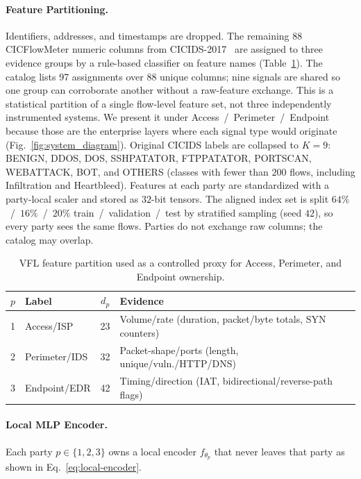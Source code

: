 \documentclass[10pt, conference]{IEEEtran}
\begin{document}
\paragraph{Feature Partitioning.}
Identifiers, addresses, and timestamps are dropped. The remaining 88 CICFlowMeter numeric columns from CICIDS-2017~\cite{sharafaldin2018} are assigned to three evidence groups by a rule-based classifier on feature names (Table~\ref{tab:detect-parties}). The catalog lists 97 assignments over 88 unique columns; nine signals are shared so one group can corroborate another without a raw-feature exchange. This is a statistical partition of a single flow-level feature set, not three independently instrumented systems. We present it under Access~/~Perimeter~/~Endpoint because those are the enterprise layers where each signal type would originate (Fig.~\ref{fig:system_diagram}). Original CICIDS labels are collapsed to $K=9$: BENIGN, DDOS, DOS, SSHPATATOR, FTPPATATOR, PORTSCAN, WEBATTACK, BOT, and OTHERS (classes with fewer than $200$ flows, including Infiltration and Heartbleed). Features at each party are standardized with a party-local scaler and stored as $32$-bit tensors. The aligned index set is split $64\%$~/~$16\%$~/~$20\%$ train~/~validation~/~test by stratified sampling (seed $42$), so every party sees the same flows. Parties do not exchange raw columns; the catalog may overlap.

\begin{table}[t]
\caption{VFL feature partition used as a controlled proxy for Access, Perimeter, and Endpoint ownership.}
\label{tab:detect-parties}
\centering
\small
\begin{tabularx}{\columnwidth}{@{}clc>{\RaggedRight\arraybackslash}X@{}}
\hline
$p$ & Label & $d_p$ & Evidence \\
\hline
1 & Access/ISP     & 23 & Volume/rate (duration, packet/byte totals, SYN counters) \\
2 & Perimeter/IDS  & 32 & Packet-shape/ports (length, unique/vuln./HTTP/DNS) \\
3 & Endpoint/EDR   & 42 & Timing/direction (IAT, bidirectional/reverse-path flags) \\
\hline
\end{tabularx}
\end{table}

\paragraph{Local MLP Encoder.}
Each party $p \in \{1,2,3\}$ owns a local encoder $f_{\theta_p}$ that never leaves that party as shown in Eq.~\eqref{eq:local-encoder}.
\end{document}
